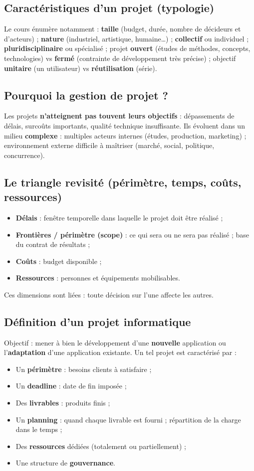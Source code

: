 \documentclass[11pt,a4paper]{article}
\begin{document}
\subsection{Caractéristiques d'un projet (typologie)}
Le cours énumère notamment : \textbf{taille} (budget, durée, nombre de décideurs et d'acteurs) ; \textbf{nature} (industriel, artistique, humaine\ldots) ; \textbf{collectif} ou individuel ; \textbf{pluridisciplinaire} ou spécialisé ; projet \textbf{ouvert} (études de méthodes, concepts, technologies) vs \textbf{fermé} (contrainte de développement très précise) ; objectif \textbf{unitaire} (un utilisateur) vs \textbf{réutilisation} (série).

\subsection{Pourquoi la gestion de projet ?}
Les projets \textbf{n'atteignent pas touvent leurs objectifs} : dépassements de délais, surcoûts importants, qualité technique insuffisante. Ils évoluent dans un milieu \textbf{complexe} : multiples acteurs internes (études, production, marketing) ; environnement externe difficile à maîtriser (marché, social, politique, concurrence).

\subsection{Le triangle revisité (périmètre, temps, coûts, ressources)}
\begin{itemize}[nosep]
  \item \textbf{Délais} : fenêtre temporelle dans laquelle le projet doit être réalisé ;
  \item \textbf{Frontières / périmètre (scope)} : ce qui sera ou ne sera pas réalisé ; base du contrat de résultats ;
  \item \textbf{Coûts} : budget disponible ;
  \item \textbf{Ressources} : personnes et équipements mobilisables.
\end{itemize}
Ces dimensions sont liées : toute décision sur l'une affecte les autres.

\subsection{Définition d'un projet informatique}
Objectif : mener à bien le développement d'une \textbf{nouvelle} application ou l'\textbf{adaptation} d'une application existante. Un tel projet est caractérisé par :
\begin{itemize}[nosep]
  \item Un \textbf{périmètre} : besoins clients à satisfaire ;
  \item Un \textbf{deadline} : date de fin imposée ;
  \item Des \textbf{livrables} : produits finis ;
  \item Un \textbf{planning} : quand chaque livrable est fourni ; répartition de la charge dans le temps ;
  \item Des \textbf{ressources} dédiées (totalement ou partiellement) ;
  \item Une structure de \textbf{gouvernance}.
\end{itemize}
\end{document}
